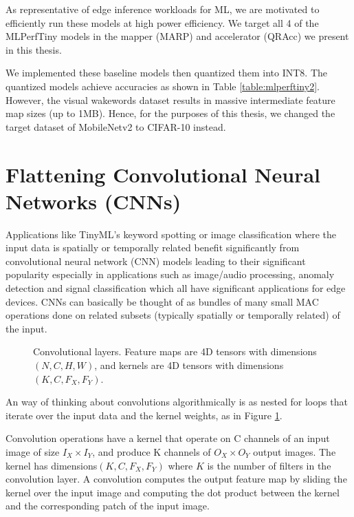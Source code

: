 As representative of edge inference workloads for ML, we are motivated to efficiently run these models at high power efficiency. We target all 4 of the MLPerfTiny models in the mapper (MARP) and accelerator (QRAcc) we present in this thesis.

We implemented these baseline models then quantized them into INT8. The quantized models achieve accuracies as shown in Table \ref{table:mlperftiny2}. However, the visual wakewords dataset results in massive intermediate feature map sizes (up to 1MB). Hence, for the purposes of this thesis, we changed the target dataset of MobileNetv2 to CIFAR-10 instead.

\section{Flattening Convolutional Neural Networks (CNNs)}
\label{section:cnn_flattening}

Applications like TinyML's keyword spotting or image classification where the input data is spatially or temporally related benefit significantly from convolutional neural network (CNN) models leading to their significant popularity especially in applications such as image/audio processing, anomaly detection and signal classification which all have significant applications for edge devices. CNNs can basically be thought of as bundles of many small MAC operations done on related subsets (typically spatially or temporally related) of the input.

\begin{figure}[htbp]
    \centering
    
    \caption{Convolutional layers. Feature maps are 4D tensors with dimensions $(N,C,H,W)$, and kernels are 4D tensors with dimensions $(K,C,F_X,F_Y)$.}
    \label{fig:convolution_algorithm}
\end{figure}

An way of thinking about convolutions algorithmically is as nested for loops that iterate over the input data and the kernel weights, as in Figure \ref{fig:convolution_algorithm}.

Convolution operations have a kernel that operate on C channels of an input image of size $I_X\times I_Y$, and produce K channels of $O_X\times O_Y$ output images. The kernel has dimensions$(K,C,F_X,F_Y)$ where $K$ is the number of filters in the convolution layer. A convolution computes the output feature map by sliding the kernel over the input image and computing the dot product between the kernel and the corresponding patch of the input image.

